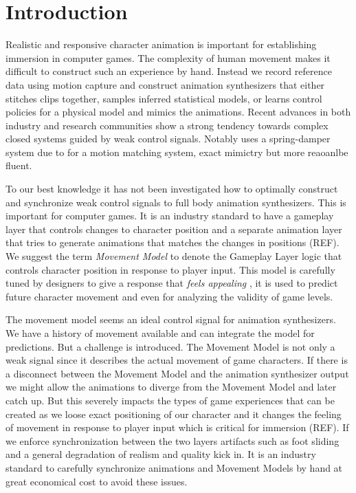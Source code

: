 \section{Introduction}
Realistic and responsive character animation is important for establishing immersion in computer games. The complexity of human movement makes it difficult to construct such an experience by hand. Instead we record reference data using motion capture and construct animation synthesizers that either stitches clips together, samples inferred statistical models, or learns control policies for a physical model and mimics the animations. Recent advances in both industry and research communities show a strong tendency towards complex closed systems guided by weak control signals. Notably \citep{holden.ea20} uses a spring-damper system due to \citep{kermse.04} for a motion matching system, exact mimictry but more reaoanlbe fluent.

To our best knowledge it has not been investigated how to optimally construct and synchronize weak control signals to full body animation synthesizers. This is important for computer games. It is an industry standard to have a gameplay layer that controls changes to character position and a separate animation layer that tries to generate animations that matches the changes in positions (REF). We suggest the term \textit{Movement Model} to denote the Gameplay Layer logic that controls character position in response to player input. This model is carefully tuned by designers to give a response that \textit{feels appealing} , it is used to predict future character movement and even for analyzing the validity of game levels. 

The movement model seems an ideal control signal for animation synthesizers. We have a history of movement available and can integrate the model for predictions. But a challenge is introduced. The Movement Model is not only a weak signal since it describes the actual movement of game characters. If there is a disconnect between the Movement Model and the animation synthesizer output we might allow the animations to diverge from the Movement Model and later catch up. But this severely impacts the types of game experiences that can be created as we loose exact positioning of our character and it changes the feeling of movement in response to player input which is critical for immersion (REF). If we enforce synchronization between the two layers artifacts such as foot sliding and a general degradation of realism and quality kick in. It is an industry standard to carefully synchronize animations and Movement Models by hand at great economical cost to avoid these issues.

